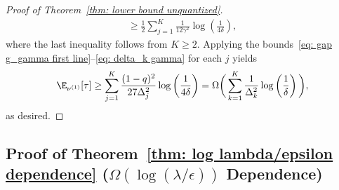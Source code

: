 \begin{proof}[Proof of Theorem~\ref{thm: lower bound unquantized}]
\begin{align}
     \ge
    \frac{1}{2}
    \sum_{j=1}^K
     \frac{1}{12 \gamma^2} \log \left( \frac{1}{4 \delta}  \right),
\end{align}
where the last inequality follows from $K \ge 2$.
Applying the bounds~\eqref{eq: gap g_gamma first line}--\eqref{eq: delta_k gamma} for each $j$ yields
\begin{equation}
    \E_{\nu^{(1)}}[\tau]
     \ge
     \sum_{j=1}^K
    \frac{(1-q)^2}{27 \Delta_j^2}
    \log \left( \frac{1}{4 \delta} \right)
    = \Omega \bigg(
\sum_{k=1}^K
 \frac{1}{\Delta_k^2}
    \log \left( \frac{1}{\delta} \right)
    \bigg),
\end{equation}
as desired.
\end{proof}




\subsection{Proof of Theorem~\ref{thm: log lambda/epsilon dependence} ($\Omega(\log(\lambda/\epsilon))$ Dependence)}
\label{sec: appendix log lambda epsilon dependence}
